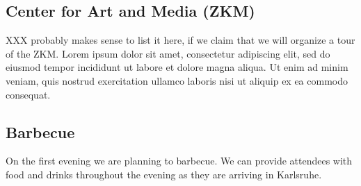 \begin{multicols}{2}

\subsection{Center for Art and Media (ZKM)}

XXX probably makes sense to list it here, if we claim that we will organize
a tour of the ZKM. Lorem ipsum dolor sit amet, consectetur adipiscing elit, sed do eiusmod tempor incididunt ut labore et dolore magna aliqua. Ut enim ad minim veniam, quis nostrud exercitation ullamco laboris nisi ut aliquip ex ea commodo consequat.

\subsection{Barbecue}

On the first evening we are planning to barbecue. We can provide attendees with
food and drinks throughout the evening as they are arriving in Karlsruhe.



\end{multicols}

